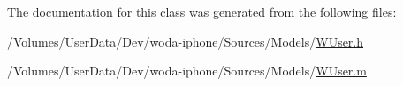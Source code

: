 The documentation for this class was generated from the following files\-:\begin{DoxyCompactItemize}
\item 
/\-Volumes/\-User\-Data/\-Dev/woda-\/iphone/\-Sources/\-Models/\hyperlink{_w_user_8h}{W\-User.\-h}\item 
/\-Volumes/\-User\-Data/\-Dev/woda-\/iphone/\-Sources/\-Models/\hyperlink{_w_user_8m}{W\-User.\-m}\end{DoxyCompactItemize}
